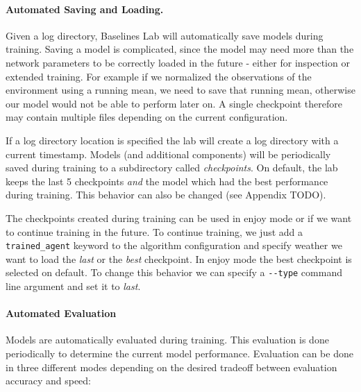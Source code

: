 \paragraph{Automated Saving and Loading.}
Given a log directory, Baselines Lab will automatically save models during training. Saving a model is complicated, since the model may need more than the network parameters to be correctly loaded in the future - either for inspection or extended training. For example if we normalized the observations of the environment using a running mean, we need to save that running mean, otherwise our model would not be able to perform later on. A single checkpoint therefore may contain multiple files depending on the current configuration.

If a log directory location is specified the lab will create a log directory with a current timestamp. Models (and additional components) will be periodically saved during training to a subdirectory called \textit{checkpoints}. On default, the lab keeps the last 5 checkpoints \textit{and} the model which had the best performance during training. This behavior can also be changed (see Appendix TODO).

The checkpoints created during training can be used in enjoy mode or if we want to continue training in the future. To continue training, we just add a \texttt{trained\_agent} keyword to the algorithm configuration and specify weather we want to load the \textit{last} or the \textit{best} checkpoint. In enjoy mode the best checkpoint is selected on default. To change this behavior we can specify a \texttt{-{}-type} command line argument and set it to \textit{last}.

\paragraph{Automated Evaluation}
Models are automatically evaluated during training. This evaluation is done periodically to determine the current model performance. Evaluation can be done in three different modes depending on the desired tradeoff between evaluation accuracy and speed:

